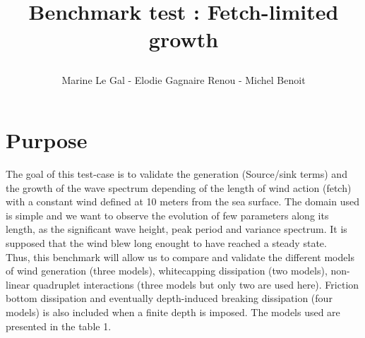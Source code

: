 \documentclass[10pt]{article}
\title{\begin{Large}
\textbf{Benchmark test : Fetch-limited growth}\\
\end{Large}}
\author{Marine Le Gal - Elodie Gagnaire Renou - Michel Benoit}
\begin{document}
\maketitle

\section{Purpose}
The goal of this test-case is to validate the generation (Source/sink terms)  and the growth of the wave spectrum depending of the length of wind action (fetch) with a constant wind defined at 10 meters from the sea surface. The domain used is simple and we want to observe the evolution of few parameters along its length, as the significant wave height, peak period and variance spectrum.
It is supposed that the wind blew long enought to have reached a steady state.\\
Thus, this benchmark will allow us to compare and validate the different models of wind generation (three models), whitecapping dissipation (two models), non-linear quadruplet interactions (three models but only two are used here). Friction bottom dissipation and eventually depth-induced breaking dissipation (four models) is also included when a finite depth is imposed. The models used are presented in the table 1.\\ \quad \\
\vspace{1cm}
\hspace{-2cm}
\end{document}
